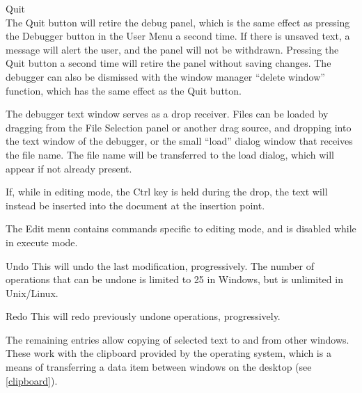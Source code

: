\begin{description}
\item{\cb Quit}\\
The {\cb Quit} button will retire the debug panel, which is the same
effect as pressing the {\cb Debugger} button in the {\cb User Menu} a
second time.  If there is unsaved text, a message will alert the user,
and the panel will not be withdrawn.  Pressing the {\cb Quit} button a
second time will retire the panel without saving changes.  The
debugger can also be dismissed with the window manager ``delete
window'' function, which has the same effect as the {\cb Quit} button.
\end{description}

The debugger text window serves as a drop receiver.  Files can be
loaded by dragging from the {\cb File Selection} panel or another drag
source, and dropping into the text window of the debugger, or the
small ``load'' dialog window that receives the file name.  The file
name will be transferred to the load dialog, which will appear if not
already present.

If, while in editing mode, the {\kb Ctrl} key is held during the drop,
the text will instead be inserted into the document at the insertion
point.

The {\cb Edit} menu contains commands specific to editing mode, and is
disabled while in execute mode.

\begin{description}
\item{\cb Undo}
This will undo the last modification, progressively.  The number of
operations that can be undone is limited to 25 in Windows, but is
unlimited in Unix/Linux.

\item{\cb Redo}
This will redo previously undone operations, progressively.
\end{description}

The remaining entries allow copying of selected text to and from other
windows.  These work with the clipboard provided by the operating
system, which is a means of transferring a data item between windows
on the desktop (see \ref{clipboard}).

